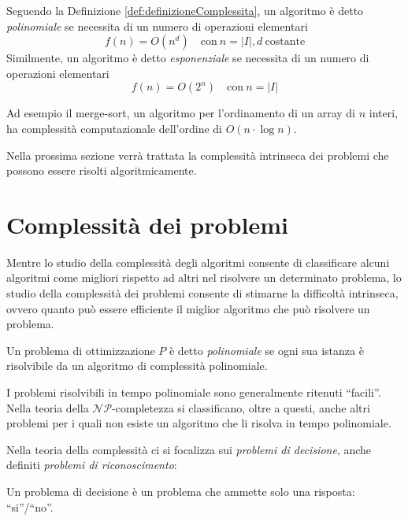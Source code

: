 Seguendo la Definizione \ref{def:definizioneComplessita}, un algoritmo è detto 
\emph{polinomiale} se necessita di un numero di operazioni elementari
\begin{displaymath}
 f(n) = O(n^d) \quad \text{con}\  n = \vert I \vert, d\  \text{costante}
\end{displaymath}
Similmente, un algoritmo è detto \emph{esponenziale} se necessita di un numero di 
operazioni elementari
\begin{displaymath}
 f(n) = O(2^n) \quad \text{con}\ n = \vert I \vert
\end{displaymath}

Ad esempio il merge-sort, un algoritmo per l'ordinamento di un array di $n$ interi, ha 
complessità computazionale dell'ordine di $O(n\cdot \log n)$.

Nella prossima sezione verrà trattata la complessità intrinseca dei problemi che possono 
essere risolti algoritmicamente.

\section{Complessità dei problemi}
\label{sec:complessitaProblemi}
Mentre lo studio della complessità degli algoritmi consente di classificare alcuni 
algoritmi come migliori rispetto ad altri nel risolvere un determinato problema, lo 
studio della complessità dei problemi consente di stimarne la difficoltà intrinseca, 
ovvero quanto può essere efficiente il miglior algoritmo che può risolvere un problema.

\begin{mydef}
 Un problema di ottimizzazione $P$ è detto \emph{polinomiale} se ogni sua istanza è 
risolvibile da un algoritmo di complessità polinomiale.
\end{mydef}
I problemi risolvibili in tempo polinomiale sono generalmente ritenuti ``facili''. Nella 
teoria della $\mathcal{NP}$-completezza si classificano, oltre a questi, anche altri 
problemi per i quali non esiste un algoritmo che li risolva in tempo polinomiale.

Nella teoria della complessità ci si focalizza sui \emph{problemi di decisione}, anche 
definiti \emph{problemi di riconoscimento}:
\begin{mydef}
 Un problema di decisione è un problema che ammette solo una risposta: ``si''/``no''.
\end{mydef}

